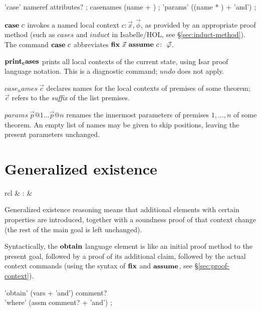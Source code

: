 \begin{rail}
  'case' nameref attributes?
  ;
  casenames (name + )
  ;
  'params' ((name * ) + 'and')
  ;
\end{rail}

\begin{descr}
\item [${\mathord{\mathbf{case}}}~c$] invokes a named local context $c\colon \vec x, \vec \phi$,
  as provided by an appropriate proof method (such as $cases$ and $induct$ in
  Isabelle/HOL, see \S\ref{sec:induct-method}).  The command ${\mathord{\mathbf{case}}}~c$
  abbreviates $\FIX{\vec x}~\ASSUME{c}{\vec\phi}$.
\item [${\mathord{\mathbf{print_cases}}}$] prints all local contexts of the current
  state, using Isar proof language notation.  This is a diagnostic command;
  $undo$ does not apply.
\item [$case_names~\vec c$] declares names for the local contexts of premises
  of some theorem; $\vec c$ refers to the \emph{suffix} of the list premises.
\item [$params~\vec p@1 \dots \vec p@n$] renames the innermost parameters of
  premises $1, \dots, n$ of some theorem.  An empty list of names may be given
  to skip positions, leaving the present parameters unchanged.
\end{descr}


\section{Generalized existence}

\begin{matharray}{rcl}
   & : &  \\
\end{matharray}

Generalized existence reasoning means that additional elements with certain
properties are introduced, together with a soundness proof of that context
change (the rest of the main goal is left unchanged).

Syntactically, the ${\mathord{\mathbf{obtain}}}$ language element is like an initial proof
method to the present goal, followed by a proof of its additional claim,
followed by the actual context commands (using the syntax of ${\mathord{\mathbf{fix}}}$ and
${\mathord{\mathbf{assume}}}$, see \S\ref{sec:proof-context}).

\begin{rail}
  'obtain' (vars + 'and') comment? \\ 'where' (assm comment? + 'and')
  ;
\end{rail}


